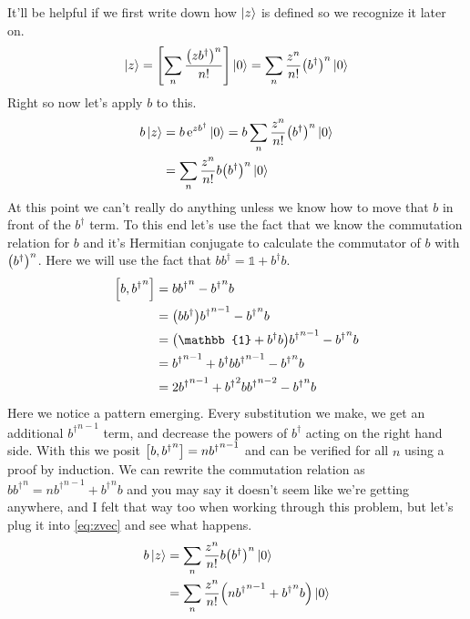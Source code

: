 \documentclass[boxes,pages]{homework}
\makeatletter
\newcommand{\herm}[1]{{{#1}^\dagger}}
\newcommand{\e}{\mathrm{e}}
\numberwithin{@problem}{section}
\makeatother
\begin{document}
\begin{solution}
	It'll be helpful if we first write down how $\ket{z}$ is defined so we recognize it later on.
	\begin{equation*}
		\ket{z} = \qty[\sum_n\frac{\qty(z\herm{b})^n}{n!}]\ket{0} = \sum_n\frac{z^n}{n!}\qty(\herm{b})^n\ket{0}
	\end{equation*}
	Right so now let's apply $b$ to this.
	\begin{align}
		b\ket{z} & = b\,\e^{z\herm{b}}\ket{0} = b\sum_n\frac{z^n}{n!}\qty(\herm{b})^n\ket{0} \nonumber \\
		         & = \sum_n\frac{z^n}{n!}b \qty(\herm{b})^n\ket{0} \label{eq:zvec}
	\end{align}
	At this point we can't really do anything unless we know how to move that $b$ in front of the $\herm{b}$ term. To this end let's use the fact that we know the commutation relation for $b$ and it's Hermitian conjugate to calculate the commutator of $b$ with $\qty(\herm{b})^n$. Here we will use the fact that $b\herm{b} = \mathbb{1} + \herm{b}b$.
	\begin{align*}
		\comm{b}{\herm{b}^n} & = b\herm{b}^n - \herm{b}^nb                                   \\
		                     & = \qty(b\herm{b})\herm{b}^{n - 1} - \herm{b}^nb               \\
		                     & = \qty(\mathbb{1} + \herm{b}b)\herm{b}^{n - 1} - \herm{b}^nb  \\
		                     & = \herm{b}^{n - 1} + \herm{b}b\herm{b}^{n - 1} - \herm{b}^nb  \\
		                     & = 2\herm{b}^{n-1} + \herm{b}^2b\herm{b}^{n - 2} - \herm{b}^nb
	\end{align*}
	Here we notice a pattern emerging. Every substitution we make, we get an additional $\herm{b}^{n - 1}$ term, and decrease the powers of $\herm{b}$ acting on the right hand side. With this we posit $\comm{b}{\herm{b}^n} = n\herm{b}^{n - 1}$ and can be verified for all $n$ using a proof by induction. We can rewrite the commutation relation as $b\herm{b}^n = n\herm{b}^{n - 1} + \herm{b}^nb$ and you may say it doesn't seem like we're getting anywhere, and I felt that way too when working through this problem, but let's plug it into \cref{eq:zvec} and see what happens.
	\begin{align*}
		b\ket{z} & = \sum_n\frac{z^n}{n!}b \qty(\herm{b})^n\ket{0}                    \\
		         & = \sum_n\frac{z^n}{n!}\qty(n\herm{b}^{n - 1} + \herm{b}^nb)\ket{0}

\end{align*}
\end{solution}
\end{document}
